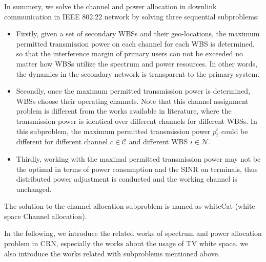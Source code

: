 In summery, we solve the channel and power allocation in downlink communication in IEEE 802.22 network by solving three sequential subproblems:
\begin{itemize}
\item  Firstly, given a set of secondary WBSs and their geo-locations, the maximum permitted transmission power on each channel for each WBS is determined, so that the interference margin of primary users can not be exceeded no matter how WBSs utilize the spectrum and power resources.
In other words, the dynamics in the secondary network is transparent to the primary system. 
\item Secondly, once the maximum permitted transmission power is determined, WBSs choose their operating channels.
Note that this channel assignment problem is different from the works available in literature, where the transmission power is identical over different channels for different WBSs.
In this subproblem, the maximum permitted transmission power $p_i^c$ could be different for different channel $c\in \mathcal{C}$ and different WBS $i\in \mathcal{N}$.
\item Thirdly, working with the maximal permitted transmission power may not be the optimal in terms of power consumption and the SINR on terminals, thus distributed power adjustment is conducted and the working channel is unchanged.
\end{itemize}
The solution to the channel allocation subproblem is named as \gls{whiteCat} (white space Channel allocation).

In the following, we introduce the related works of spectrum and power allocation problem in CRN, especially the works about the usage of TV white space.
we also introduce the works related with subproblems mentioned above.



